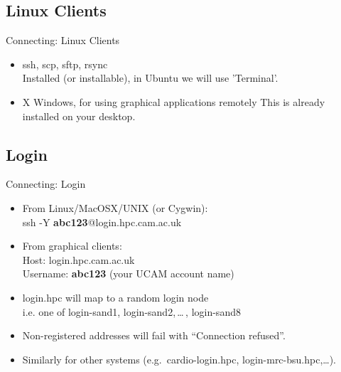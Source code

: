 \subsection{Linux Clients}
\begin{frame}{Connecting: Linux Clients}
\begin{itemize}
\item {\color<2->{red}ssh}, scp, sftp, {rsync}\hfill\\
\alert{\small Installed (or installable), in Ubuntu we will use 'Terminal'.}
\item {X Windows, for using graphical applications remotely}
\alert{\small This is already installed on your desktop.}
\end{itemize}
\end{frame}

\subsection{Login}
\begin{frame}{Connecting: Login}
\begin{itemize}
\item From Linux/MacOSX/UNIX (or Cygwin):\hfill\\
\alert{ssh -Y \textbf{abc123}@login.hpc.cam.ac.uk}
\pause
\item From graphical clients:\hfill\\
Host: \alert{login.hpc.cam.ac.uk}\hfill\\
Username: \alert{\textbf{abc123}} (your UCAM account name)
\pause
\item login.hpc will map to a random login node\hfill\\
\alert{i.e. one of login-sand1, login-sand2,\,\ldots\,, login-sand8}\hfill\\
\item<5->Non-registered addresses will fail with ``Connection refused''.
\item<6->Similarly for other systems (e.g.\ cardio-login.hpc, login-mrc-bsu.hpc,\ldots). 
\end{itemize}
\end{frame}

